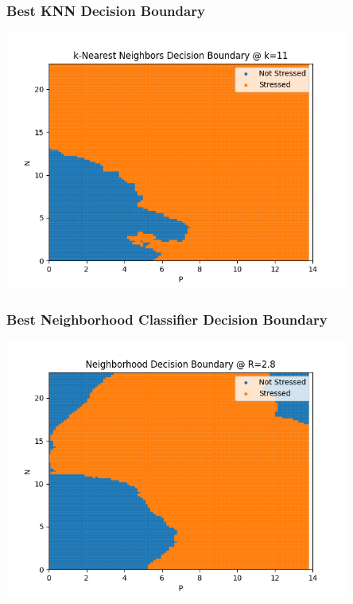 \documentclass[a4paper, 11pt, titlepage]{article}
\begin{document}
  \subsubsection{Best KNN Decision Boundary}
  \par \includegraphics[width=0.85\textwidth]{images/knn_dec_bound.png}
  \subsubsection{Best Neighborhood Classifier Decision Boundary}
  \par \includegraphics[width=0.85\textwidth]{images/neighborhood_dec_bound.png}
\end{document}
